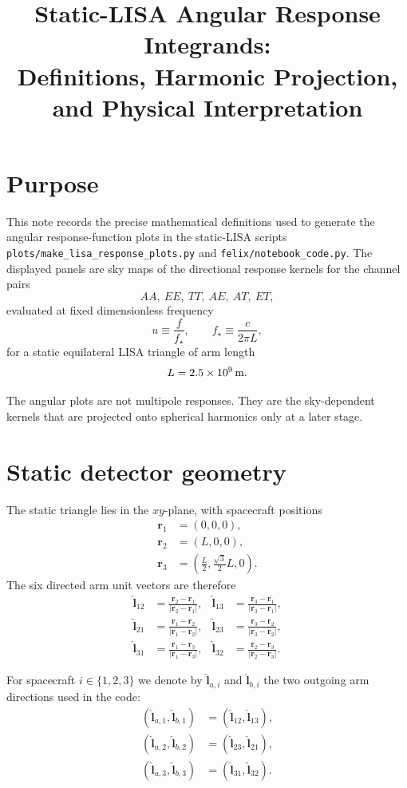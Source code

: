 \documentclass[11pt]{article}
\title{Static-LISA Angular Response Integrands:\\Definitions, Harmonic Projection, and Physical Interpretation}
\author{}
\date{}
\begin{document}
\maketitle

\section{Purpose}

This note records the precise mathematical definitions used to generate the angular response-function plots in the static-LISA scripts
\texttt{plots/make\_lisa\_response\_plots.py} and
\texttt{felix/notebook\_code.py}.
The displayed panels are sky maps of the directional response kernels for the channel pairs
\[
AA,\ EE,\ TT,\ AE,\ AT,\ ET,
\]
evaluated at fixed dimensionless frequency
\[
u \equiv \frac{f}{f_\star},
\qquad
f_\star \equiv \frac{c}{2\pi L},
\]
for a static equilateral LISA triangle of arm length
\[
L = 2.5\times 10^9\,{\rm m}.
\]

The angular plots are not multipole responses.
They are the sky-dependent kernels that are projected onto spherical harmonics only at a later stage.

\section{Static detector geometry}

The static triangle lies in the $xy$-plane, with spacecraft positions
\begin{align}
\bm r_1 &= (0,0,0), \\
\bm r_2 &= (L,0,0), \\
\bm r_3 &= \left(\frac{L}{2}, \frac{\sqrt{3}}{2}L, 0\right).
\end{align}
The six directed arm unit vectors are therefore
\begin{align}
\hat{\bm l}_{12} &= \frac{\bm r_2 - \bm r_1}{|\bm r_2 - \bm r_1|},
&
\hat{\bm l}_{13} &= \frac{\bm r_3 - \bm r_1}{|\bm r_3 - \bm r_1|}, \\
\hat{\bm l}_{21} &= \frac{\bm r_1 - \bm r_2}{|\bm r_1 - \bm r_2|},
&
\hat{\bm l}_{23} &= \frac{\bm r_3 - \bm r_2}{|\bm r_3 - \bm r_2|}, \\
\hat{\bm l}_{31} &= \frac{\bm r_1 - \bm r_3}{|\bm r_1 - \bm r_3|},
&
\hat{\bm l}_{32} &= \frac{\bm r_2 - \bm r_3}{|\bm r_2 - \bm r_3|}.
\end{align}

For spacecraft $i\in\{1,2,3\}$ we denote by $\hat{\bm l}_{a,i}$ and $\hat{\bm l}_{b,i}$ the two outgoing arm directions used in the code:
\begin{align}
(\hat{\bm l}_{a,1},\hat{\bm l}_{b,1}) &= (\hat{\bm l}_{12},\hat{\bm l}_{13}), \\
(\hat{\bm l}_{a,2},\hat{\bm l}_{b,2}) &= (\hat{\bm l}_{23},\hat{\bm l}_{21}), \\
(\hat{\bm l}_{a,3},\hat{\bm l}_{b,3}) &= (\hat{\bm l}_{31},\hat{\bm l}_{32}).
\end{align}
\end{document}
